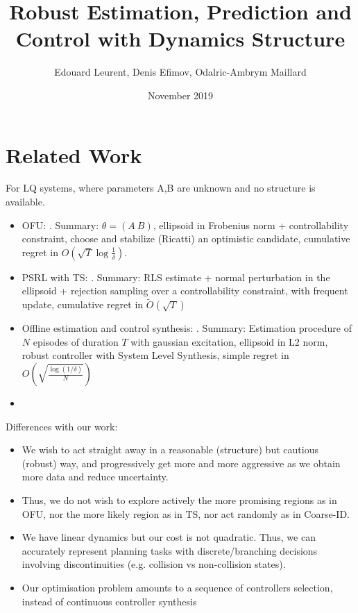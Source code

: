 \documentclass{article}
\title{Robust Estimation, Prediction and Control with Dynamics Structure}
\author{Edouard Leurent, Denis Efimov, Odalric-Ambrym Maillard}
\date{November 2019}
\begin{document}
\maketitle

\section{Related Work}

For LQ systems, where parameters A,B are unknown and no structure is available.
\begin{itemize}
    \item OFU: \citep{abbasi-yadkori11a}. Summary: $\theta=(A~B)$, ellipsoid in Frobenius norm + controllability constraint, choose and stabilize (Ricatti) an optimistic candidate, cumulative regret in $O(\sqrt{T}\log\frac{1}{\delta})$.
    \item PSRL with TS: \citep{abeille18a}. Summary: RLS estimate + normal perturbation in the ellipsoid + rejection sampling over a controllability constraint, with frequent update, cumulative regret in $\tilde{O}(\sqrt{T})$
    \item Offline estimation and control synthesis: \citep{Dean2017}. Summary: Estimation procedure of $N$ episodes of duration $T$ with gaussian excitation, ellipsoid in L2 norm, robust controller with System Level Synthesis, simple regret in $O(\sqrt{\frac{\log(1/\delta)}{N}})$
    \item \citep{Dean2018}
\end{itemize}

Differences with our work:
\begin{itemize}
    \item We wish to act straight away in a reasonable (structure) but cautious (robust) way, and progressively get more and more aggressive as we obtain more data and reduce uncertainty.
    \item Thus, we do not wish to explore actively the more promising regions as in OFU, nor the more likely region as in TS, nor act randomly as in Coarse-ID.
    \item We have linear dynamics but our cost is not quadratic. Thus, we can accurately represent planning tasks with discrete/branching decisions involving discontinuities (e.g. collision vs non-collision states).
    \item Our optimisation problem amounts to a sequence of controllers selection, instead of continuous controller synthesis
    
\end{itemize}
\end{document}
